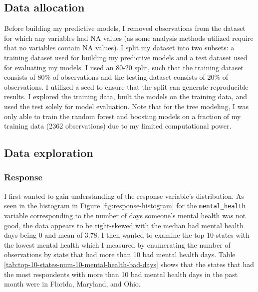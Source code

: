 \documentclass[
]{article}
\begin{document}
\hypertarget{data-allocation}{%
\subsection{Data allocation}\label{data-allocation}}

Before building my predictive models, I removed observations from the dataset for which any variables had NA values (as some analysis methods utilized require that no variables contain NA values). I split my dataset into two subsets: a training dataset used for building my predictive models and a test dataset used for evaluating my models. I used an 80-20 split, such that the training dataset consists of 80\% of observations and the testing dataset consists of 20\% of observations. I utilized a seed to ensure that the split can generate reproducible results. I explored the training data, built the models on the training data, and used the test solely for model evaluation. Note that for the tree modeling, I was only able to train the random forest and boosting models on a fraction of my training data (2362 observations) due to my limited computational power.

\hypertarget{data-exploration}{%
\subsection{Data exploration}\label{data-exploration}}

\hypertarget{response}{%
\subsubsection{Response}\label{response}}

I first wanted to gain understanding of the response variable's distribution. As seen in the histogram in Figure \ref{fig:response-histogram} for the \texttt{mental\_health} variable corresponding to the number of days someone's mental health was not good, the data appears to be right-skewed with the median bad mental health days being 0 and mean of 3.78. I then wanted to examine the top 10 states with the lowest mental health which I measured by enumerating the number of observations by state that had more than 10 bad mental health days. Table \ref{tab:top-10-states-num-10-mental-health-bad-days} shows that the states that had the most respondents with more than 10 bad mental health days in the past month were in Florida, Maryland, and Ohio.
\end{document}
